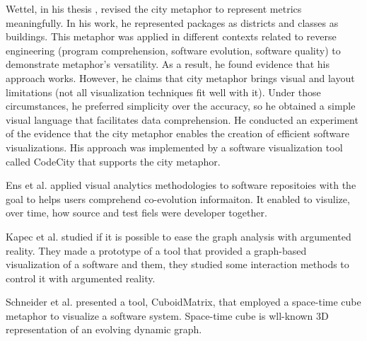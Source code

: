 Wettel, in his thesis \cite{Wettel2011}, revised the city metaphor to represent metrics meaningfully. 
In his work, he represented packages as districts and classes as buildings.
This metaphor was applied in different contexts related to reverse engineering (program comprehension, software evolution, software quality)
to demonstrate metaphor's versatility. As a result, he found evidence that his approach works.
However, he claims that city metaphor brings visual and layout limitations 
(not all visualization techniques fit well with it). Under those circumstances, he preferred simplicity over the accuracy,
so he obtained a simple visual language that facilitates data comprehension. He conducted an experiment of the evidence that the city
metaphor enables the creation of efficient software visualizations. His approach was implemented by a software visualization tool 
called CodeCity that supports the city metaphor. 





Ens et al. \cite{Ens2014} applied visual analytics methodologies to software repositoies with the goal to helps 
users comprehend co-evolution informaiton. It enabled to visulize, over time, how source and test fiels were developer together. 

Kapec et al. \cite{Kapec2015} studied if it is possible to ease the graph analysis with argumented reality. 
They made a prototype of a tool that provided a graph-based visualization of a software and them, 
they studied some interaction methods to control it with argumented reality. 

Schneider et al. \cite{Schneider2016} presented a tool, CuboidMatrix, that employed a space-time cube metaphor to visualize a software system. 
Space-time cube is wll-known 3D representation of an evolving dynamic graph. 



